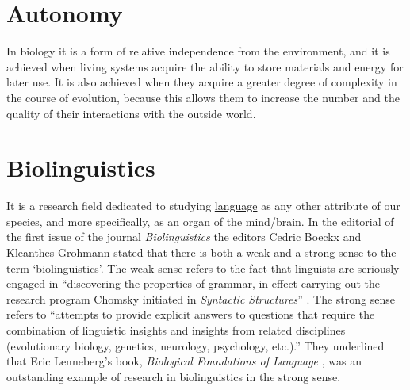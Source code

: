 \documentclass[12pt]{article}
\begin{document}
\hypertarget{autonomy}{}
\section{Autonomy}
In biology it is a form of relative independence from the environment, and it is achieved when living systems acquire the ability to store materials and energy for later use. It is also achieved when they acquire a greater degree of complexity in the course of evolution, because this allows them to increase the number and the quality of their interactions with the outside world. 


\hypertarget{biolinguistics}{}
\section{Biolinguistics}
It is a research field dedicated to studying \hyperlink{language}{language} as any other attribute of our species, and more specifically, as an organ of the mind/brain. In the editorial of the first issue of the journal \textit{Biolinguistics} \cite{boeckx07:_biolin_manif} the editors Cedric Boeckx and Kleanthes Grohmann stated that there is both a weak and a strong sense to the term `biolinguistics'. The weak sense refers to the fact that linguists are seriously engaged in ``discovering the properties of grammar, in effect carrying out the research program Chomsky initiated in \textit{Syntactic Structures}'' \cite{chomsky57:_syntac_struc}. The strong sense refers to ``attempts to provide explicit answers to questions that require the combination of linguistic insights and insights from related disciplines (evolutionary biology, genetics, neurology, psychology, etc.).'' They underlined that Eric Lenneberg's book, \textit{Biological Foundations of Language} \cite{lenneberg67:_biolog_found_languag}, was an outstanding example of research in biolinguistics in the strong sense.


\hypertarget{biosemiotics}{}
\end{document}
